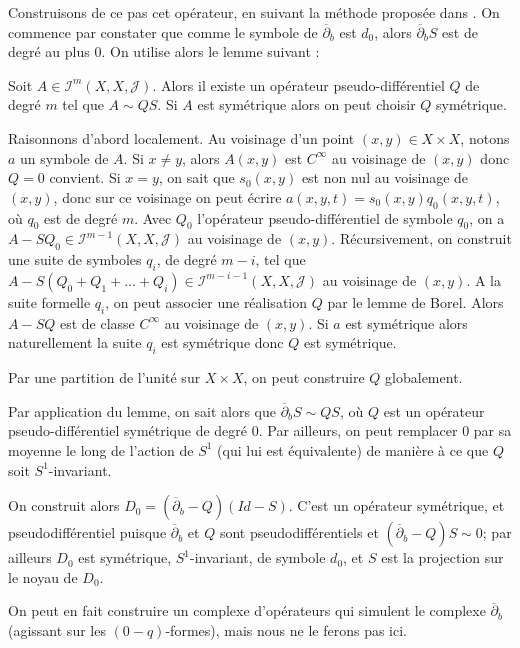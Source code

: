 Construisons de ce pas cet opérateur, en suivant la méthode proposée dans \cite{BoutetdeMonvel1981}. On commence par constater que comme le symbole de $\overline{\partial}_b$ est $d_0$, alors $\overline{\partial}_b S$ est de degré au plus $0$. On utilise alors le lemme suivant :

\begin{lem}
	Soit $A \in \mathcal{I}^m(X,X,\mathcal{J})$. Alors il existe un opérateur pseudo-différentiel $Q$ de degré $m$ tel que $A \sim QS$. Si $A$ est symétrique alors on peut choisir $Q$ symétrique.
\end{lem}
\begin{preuve}
	Raisonnons d'abord localement. Au voisinage d'un point $(x,y) \in X\times X$, notons $a$ un symbole de $A$. Si $x \neq y$, alors $A(x,y)$ est $C^{\infty}$ au voisinage de $(x,y)$ donc $Q=0$ convient. Si $x=y$, on sait que $s_0(x,y)$ est non nul au voisinage de $(x,y)$, donc sur ce voisinage on peut écrire $a(x,y,t)=s_0(x,y)q_0(x,y,t)$, où $q_0$ est de degré $m$. Avec $Q_0$ l'opérateur pseudo-différentiel de symbole $q_0$, on a $A-SQ_0 \in \mathcal{I}^{m-1}(X,X,\mathcal{J})$ au voisinage de $(x,y)$. Récursivement, on construit une suite de symboles $q_i$, de degré $m-i$, tel que $A-S(Q_0+Q_1+\ldots + Q_i) \in \mathcal{I}^{m-i-1}(X,X,\mathcal{J})$ au voisinage de $(x,y)$. A la suite formelle $q_i$, on peut associer une réalisation $Q$ par le lemme de Borel. Alors $A-SQ$ est de classe $C^{\infty}$ au voisinage de $(x,y)$. Si $a$ est symétrique alors naturellement la suite $q_i$ est symétrique donc $Q$ est symétrique.
	
	Par une partition de l'unité sur $X \times X$, on peut construire $Q$ globalement.
\end{preuve}

Par application du lemme, on sait alors que $\overline{\partial}_b S \sim QS$, où $Q$ est un opérateur pseudo-différentiel symétrique de degré $0$. Par ailleurs, on peut remplacer $0$ par sa moyenne le long de l'action de $S^1$ (qui lui est équivalente) de manière à ce que $Q$ soit $S^1$-invariant.

On construit alors $D_0 = (\overline{\partial}_b - Q)(Id-S)$. C'est un opérateur symétrique, et pseudodifférentiel puisque $\overline{\partial}_b$ et $Q$ sont pseudodifférentiels et $(\overline{\partial}_b-Q)S \sim 0$; par ailleurs $D_0$ est symétrique, $S^1$-invariant, de symbole $d_0$, et $S$ est la projection sur le noyau de $D_0$.

On peut en fait construire un complexe d'opérateurs qui simulent le complexe $\overline{\partial}_b$ (agissant sur les $(0-q)$-formes), mais nous ne le ferons pas ici.

